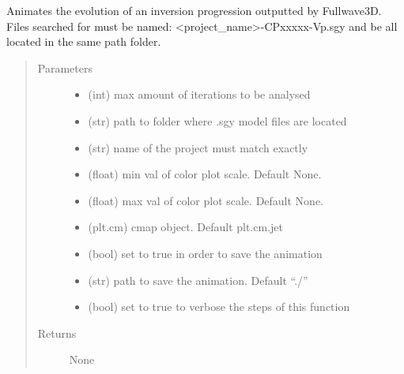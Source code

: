 \documentclass[letterpaper,10pt,english]{sphinxmanual}
\begin{document}
\begin{fulllineitems}
\label{\detokenize{index:fullwaveqc.visual.animateinv}}
Animates the evolution of an inversion progression outputted by Fullwave3D. Files searched for must be named:
\textless{}project\_name\textgreater{}-CPxxxxx-Vp.sgy and be all located in the same path folder.
\begin{quote}\begin{description}
\item[{Parameters}] \leavevmode\begin{itemize}
\item {} 
 \textendash{} (int)        max amount of iterations to be analysed

\item {} 
 \textendash{} (str)        path to folder where .sgy model files are located

\item {} 
 \textendash{} (str)        name of the project \textendash{} must match exactly

\item {} 
 \textendash{} (float)      min val of color plot scale. Default None.

\item {} 
 \textendash{} (float)      max val of color plot scale. Default None.

\item {} 
 \textendash{} (plt.cm)     cmap object. Default plt.cm.jet

\item {} 
 \textendash{} (bool)       set to true in order to save the animation

\item {} 
 \textendash{} (str)        path to save the animation. Default “./”

\item {} 
 \textendash{} (bool)       set to true to verbose the steps of this function

\end{itemize}

\item[{Returns}] \leavevmode
None

\end{description}\end{quote}

\end{fulllineitems}
\end{document}
